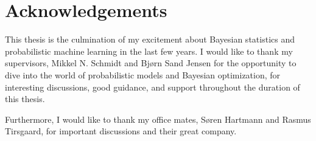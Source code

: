 \section*{Acknowledgements}
This thesis is the culmination of my excitement about Bayesian statistics and
probabilistic machine learning in the last few years. I would like to thank my supervisors, Mikkel N. Schmidt and Bjørn
Sand Jensen for the opportunity to dive into the world of probabilistic models and Bayesian
optimization, for interesting discussions, good guidance, and support throughout the duration of
this thesis. 

Furthermore, I would like to thank my office mates, Søren Hartmann and Rasmus Tirsgaard, for important
discussions and their great company. 







